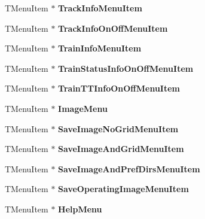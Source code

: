 \begin{DoxyCompactItemize}
\mbox{\label{class_t_interface_a0804441af6dc023b354d44db8c522355}} 
T\+Menu\+Item $\ast$ {\bfseries Track\+Info\+Menu\+Item}
\item 
\mbox{\label{class_t_interface_a488b2a94eab5b7230ed5d1051a16dc50}} 
T\+Menu\+Item $\ast$ {\bfseries Track\+Info\+On\+Off\+Menu\+Item}
\item 
\mbox{\label{class_t_interface_a0dad638d76e7d41275684714e362cf43}} 
T\+Menu\+Item $\ast$ {\bfseries Train\+Info\+Menu\+Item}
\item 
\mbox{\label{class_t_interface_a3741de0fd2f1f04f5e87a207d9d1b78a}} 
T\+Menu\+Item $\ast$ {\bfseries Train\+Status\+Info\+On\+Off\+Menu\+Item}
\item 
\mbox{\label{class_t_interface_a233d28374dbeb6b15dccb6a2dee424b9}} 
T\+Menu\+Item $\ast$ {\bfseries Train\+T\+T\+Info\+On\+Off\+Menu\+Item}
\item 
\mbox{\label{class_t_interface_a9b19287e66aae03a6673d5442950c32a}} 
T\+Menu\+Item $\ast$ {\bfseries Image\+Menu}
\item 
\mbox{\label{class_t_interface_a2b553b68656ac9d2398bf796cad8bace}} 
T\+Menu\+Item $\ast$ {\bfseries Save\+Image\+No\+Grid\+Menu\+Item}
\item 
\mbox{\label{class_t_interface_aef6c1bcfb0fdba0e490b2f60cc39a1b5}} 
T\+Menu\+Item $\ast$ {\bfseries Save\+Image\+And\+Grid\+Menu\+Item}
\item 
\mbox{\label{class_t_interface_ad02063279ff7f65971612a10a6852f38}} 
T\+Menu\+Item $\ast$ {\bfseries Save\+Image\+And\+Pref\+Dirs\+Menu\+Item}
\item 
\mbox{\label{class_t_interface_a55fa81c120a7b449b927e9243cf13261}} 
T\+Menu\+Item $\ast$ {\bfseries Save\+Operating\+Image\+Menu\+Item}
\item 
\mbox{\label{class_t_interface_a9754392369386385a52c45747774c408}} 
T\+Menu\+Item $\ast$ {\bfseries Help\+Menu}

\end{DoxyCompactItemize}
